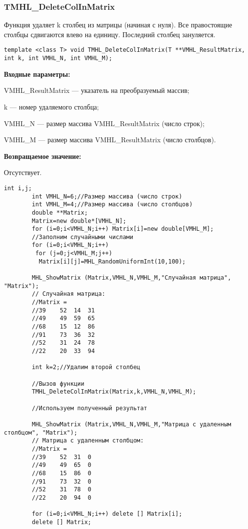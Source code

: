 \documentclass[a4paper,12pt]{article}
\begin{document}
\subsubsection{TMHL\_DeleteColInMatrix}\label{TMHL_DeleteColInMatrix}

Функция удаляет k столбец из матрицы (начиная с нуля). Все правостоящие столбцы сдвигаются влево  на единицу. Последний столбец зануляется.


\begin{lstlisting}[label=code_syntax_TMHL_DeleteColInMatrix,caption=Синтаксис]
template <class T> void TMHL_DeleteColInMatrix(T **VMHL_ResultMatrix, int k, int VMHL_N, int VMHL_M);
\end{lstlisting}

\textbf{Входные параметры:}  
 
VMHL\_ResultMatrix --- указатель на преобразуемый массив;
 
k --- номер удаляемого столбца;
 
VMHL\_N --- размер массива VMHL\_ResultMatrix (число строк);
 
VMHL\_M --- размер массива VMHL\_ResultMatrix (число столбцов).

\textbf{Возвращаемое значение:}

Отсутствует.


\begin{lstlisting}[label=code_use_TMHL_DeleteColInMatrix,caption=Пример использования]
        int i,j;
        int VMHL_N=6;//Размер массива (число строк)
        int VMHL_M=4;//Размер массива (число столбцов)
        double **Matrix;
        Matrix=new double*[VMHL_N];
        for (i=0;i<VMHL_N;i++) Matrix[i]=new double[VMHL_M];
        //Заполним случайными числами
        for (i=0;i<VMHL_N;i++)
         for (j=0;j<VMHL_M;j++)
          Matrix[i][j]=MHL_RandomUniformInt(10,100);

        MHL_ShowMatrix (Matrix,VMHL_N,VMHL_M,"Случайная матрица", "Matrix");
        // Случайная матрица:
        //Matrix =
        //39	52	14	31
        //49	49	59	65
        //68	15	12	86
        //91	73	36	32
        //52	31	24	78
        //22	20	33	94

        int k=2;//Удалим второй столбец

        //Вызов функции
        TMHL_DeleteColInMatrix(Matrix,k,VMHL_N,VMHL_M);

        //Используем полученный результат

        MHL_ShowMatrix (Matrix,VMHL_N,VMHL_M,"Матрица с удаленным столбцом", "Matrix");
        // Матрица с удаленным столбцом:
        //Matrix =
        //39	52	31	0
        //49	49	65	0
        //68	15	86	0
        //91	73	32	0
        //52	31	78	0
        //22	20	94	0

        for (i=0;i<VMHL_N;i++) delete [] Matrix[i];
        delete [] Matrix;
\end{lstlisting}
\end{document}
